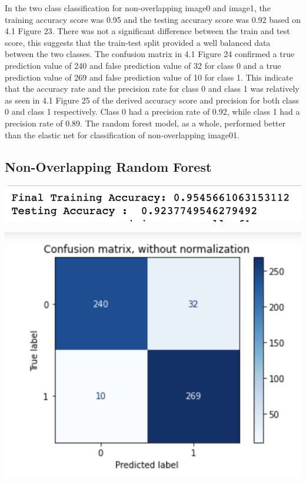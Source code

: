 \documentclass[12pt]{article}
\begin{document}
\begin{multicols*}{2}
  \hspace*{5mm} In the two class classification for non-overlapping image0 and image1, the training accuracy score was 0.95 and the testing 
  accuracy score was 0.92 based on 4.1 Figure 23. There was not a significant difference between the train and test score, this suggests that the train-test split 
  provided a well balanced data between the two classes. The confusion matrix in 4.1 Figure 24 confirmed a true prediction value of 240 and false prediction value of 
  32 for class 0 and a true prediction value of 269 and false prediction value of 10 for class 1. This indicate that the accuracy rate and the precision
  rate for class 0 and class 1 was relatively as seen in 4.1 Figure 25 of the derived accuracy score and precision for both class 0 and class 1 respectively.
  Class 0 had a precision rate of 0.92, while class 1 had a precision rate of 0.89. The random forest model, as a whole, performed better than the elastic
  net for classification of non-overlapping image01.

  \subsection{Non-Overlapping Random Forest} 
  \begin{center}
		\includegraphics[scale=0.5]{../screenshot/Rf-Non-Overlapping01/score.png}

		\includegraphics[scale=0.5]{../screenshot/Rf-Non-Overlapping01/cf.png}


\end{center}
\end{multicols*}
\end{document}
